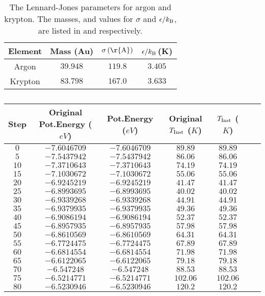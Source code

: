 \documentclass{article}
\begin{document}
\begin{table}[h!t]
\centering
\caption{The Lennard-Jones parameters for argon and krypton. The masses, and values for $\sigma$ and $\epsilon/k_{\rm{B}}$, are listed in \cite{ReviewOfParticlePhysics} and \cite{StructureAndDiffusion} respectively. \label{table:LJParams} }
\begin{tabular}{|c|c|c|c| } 
\hline
Element & Mass (Au)& $\sigma\,(\rm{\r{A}})$ & $\epsilon/k_{\rm{B}}\,$(K)\\\hline
Argon	& $39.948$ & $119.8$ & $3.405$ \\
Krypton	& $83.798$ & $167.0$ & $3.633$ \\
\hline
\end{tabular}
\end{table}


 
\begin{table}[h!t]
\centering
\caption{ }
\begin{tabular}{|c|c|c|c|c|c|c| } 
\hline
Step & Original Pot.Energy ($eV$)& Pot.Energy ($eV$) & Original $T_{\rm{Inst}}$ ($K$) & $T_{\rm{Inst}}$ ($K$)
\\\hline
$0$	& $-7.6046709$ & $-7.6046709$ & $89.89$ & $89.89$ \\
$5$	& $-7.5437942$ & $-7.5437942$ & $86.06$ & $86.06$ \\
$10$ & $-7.3710643$ & $-7.3710643$ & $74.19$ & $74.19$ \\
$15$ & $-7.1030672$ & $-7.1030672$ & $55.06$ & $55.06$ \\
$20$ & $-6.9245219$ & $-6.9245219$ & $41.47$ & $41.47$ \\
$25$ & $-6.8993695$ & $-6.8993695$ & $40.02$ & $40.02$ \\
$30$ & $-6.9339268$ & $-6.9339268$ & $44.91$ & $44.91$ \\
$35$ & $-6.9379935$ & $-6.9379935$ & $49.36$ & $49.36$ \\
$40$ & $-6.9086194$ & $-6.9086194$ & $52.37$ & $52.37$ \\
$45$ & $-6.8957935$ & $-6.8957935$ & $57.98$ & $57.98$ \\
$50$ & $-6.8610569$ & $-6.8610569$ & $64.31$ & $64.31$ \\
$55$ & $-6.7724475$ & $-6.7724475$ & $67.89$ & $67.89$ \\
$60$ & $-6.6814554$ & $-6.6814554$ & $71.98$ & $71.98$ \\
$65$ & $-6.6122065$ & $-6.6122065$ & $79.18$ & $79.18$ \\
$70$ & $-6.547248$ & $-6.547248$ & $88.53$ & $88.53$ \\
$75$ & $-6.5214771$ & $-6.5214771$ & $102.06$ & $102.06$ \\
$80$ & $-6.5230946$ & $-6.5230946$ & $120.2$ & $120.2$ \\\hline
\end{tabular}
\end{table} 
 
\end{document}
